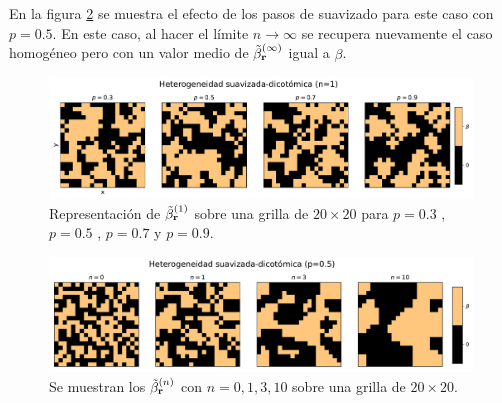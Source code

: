 En la figura \ref{fig:smoth_dic_step} se muestra el efecto de los pasos de suavizado para este caso con $p=0.5$. En este caso, al hacer el límite 
$n\to \infty$ se recupera nuevamente el caso homogéneo pero con un valor medio de $\tilde{\beta}^{(\infty)}_{\vb r}$ igual a $\beta$.
\begin{figure}[h]
  \centering
  \includegraphics[width=.9\textwidth]{het_suav_dico.pdf}
  \caption[Representación del medio DC sobre una grilla de $20 \times 20$ con $n=1$.]{Representación de $\tilde{\beta}^{(1)}_{\vb r}$ sobre una grilla de $20 \times 20$ para  $p=0.3$ , $p=0.5$ , $p=0.7$ y $p=0.9$.}
  \label{fig:smoth_dic}  
\end{figure}
\begin{figure}[h]
  \centering
  \includegraphics[width=.9\textwidth]{nsmoth_dic_step.pdf}
  \caption[Representación del medio DC sobre una grilla de $20 \times 20$ con distintos $n$.]{Se muestran los $\tilde{\beta}^{(n)}_{\vb r}$ con $n=0,1,3,10$ sobre una grilla de $20\times20$.}
  \label{fig:smoth_dic_step}
\end{figure}







